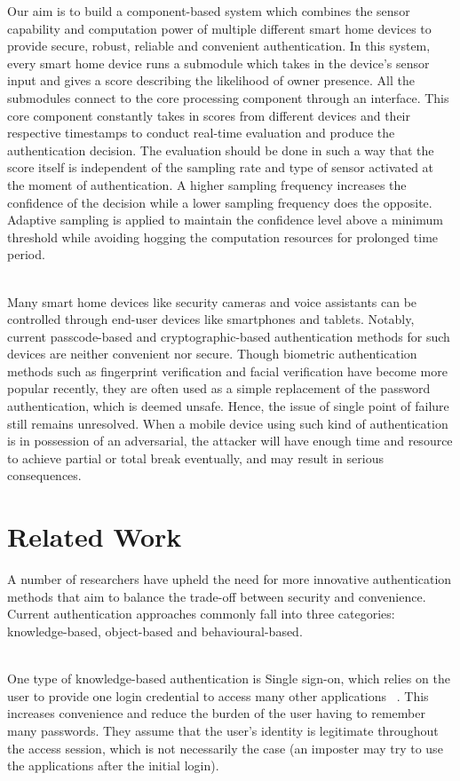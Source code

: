 \documentclass[a4paper, 11pt]{article}
\begin{document}
Our aim is to build a component-based system which combines the sensor capability and computation power of multiple different smart home devices to provide secure, robust, reliable and convenient authentication. In this system, every smart home device runs a submodule which takes in the device’s sensor input and gives a score describing the likelihood of owner presence. All the submodules connect to the core processing component through an interface. This core component constantly takes in scores from different devices and their respective timestamps to conduct real-time evaluation and produce the authentication decision. The evaluation should be done in such a way that the score itself is independent of the sampling rate and type of sensor activated at the moment of authentication. A higher sampling frequency increases the confidence of the decision while a lower sampling frequency does the opposite. Adaptive sampling is applied to maintain the confidence level above a minimum threshold while avoiding hogging the computation resources for prolonged time period.

\noindent\\
Many smart home devices like security cameras and voice assistants can be controlled through end-user devices like smartphones and tablets. Notably, current passcode-based and cryptographic-based authentication methods for such devices are neither convenient nor secure. Though biometric authentication methods such as fingerprint verification and facial verification have become more popular recently, they are often used as a simple replacement of the password authentication, which is deemed unsafe. Hence, the issue of single point of failure still remains unresolved. When a mobile device using such kind of authentication is in possession of an adversarial, the attacker will have enough time and resource to achieve partial or total break eventually, and may result in serious consequences.

\section*{Related Work}

A number of researchers have upheld the need for more innovative authentication methods that aim to balance the trade-off between security and convenience. Current authentication approaches commonly fall into three categories: knowledge-based, object-based and behavioural-based.

\noindent\\
One type of knowledge-based authentication is Single sign-on, which relies on the user to provide one login credential to access many other applications ~\cite{al2016continuous,radha2012survey}. This increases convenience and reduce the burden of the user having to remember many passwords. They assume that the user’s identity is legitimate throughout the access session, which is not necessarily the case (an imposter may try to use the applications after the initial login).  
\end{document}
